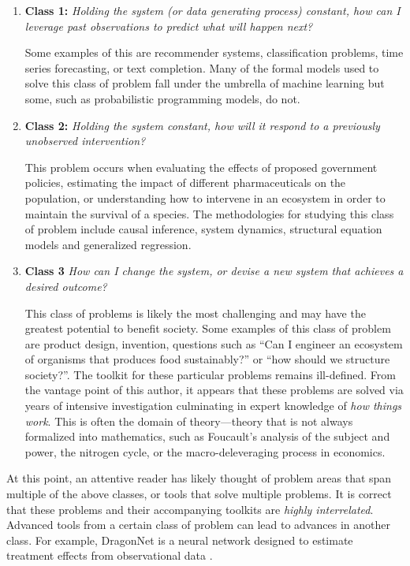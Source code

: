 \documentclass{article}
\begin{document}
\begin{enumerate}
    \item \textbf{Class 1:} \textit{Holding the system (or data generating process) constant, how can I
    leverage past observations to predict what will happen next?}
    
    Some examples of this are recommender
    systems, classification problems, time series forecasting, or text completion. Many of the formal
    models used to solve this class of problem fall under the umbrella of machine learning but some, 
    such as probabilistic programming models, do not.

    \item \textbf{Class 2:} \textit{Holding the system constant, how will
    it respond to a previously unobserved intervention?}
    
    This problem occurs when evaluating the effects of proposed
    government policies, estimating the impact of different pharmaceuticals on the population, or understanding how
    to intervene in an ecosystem in order to maintain the survival of a species. The methodologies for studying
    this class of problem include causal inference, system dynamics, structural equation models and generalized regression.

    \item \textbf{Class 3} \textit{How can I change the system, or devise a new system that achieves a
    desired outcome?}
    
    This class of problems is likely the most challenging and may have the greatest potential to benefit
    society. Some examples of this class of problem are product design, invention, questions such as
    ``Can I engineer an ecosystem of organisms that produces food sustainably?'' or
    ``how should we structure society?''. The toolkit for these particular problems remains ill-defined.
    From the vantage point of this author, it appears that these problems are solved via years of intensive
    investigation culminating in expert knowledge of \textit{how things work}. This is often the domain of
    theory---theory that is not always formalized into mathematics, such as Foucault's analysis of the subject and power,
    the nitrogen cycle, or the macro-deleveraging process in economics.

\end{enumerate}

At this point, an attentive reader has likely thought of problem areas that span multiple of the above classes, or tools
that solve multiple problems. It is correct that these problems and their accompanying toolkits are \textit{highly interrelated}.
Advanced tools from a certain class of problem can lead to advances in another class. For example, DragonNet is a neural
network designed to estimate treatment effects from observational data  \cite{shi2019adapting}. 
\end{document}
